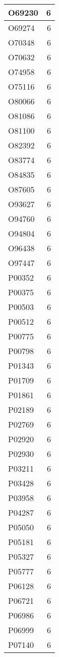 \documentclass[
]{book}
\theoremstyle{definition}
\theoremstyle{definition}
\theoremstyle{definition}
\theoremstyle{definition}
\theoremstyle{remark}
\begin{document}
\begin{table}
\begin{tabular}{l|r}
\hline
O69230 & 6\\
\hline
O69274 & 6\\
\hline
O70348 & 6\\
\hline
O70632 & 6\\
\hline
O74958 & 6\\
\hline
O75116 & 6\\
\hline
O80066 & 6\\
\hline
O81086 & 6\\
\hline
O81100 & 6\\
\hline
O82392 & 6\\
\hline
O83774 & 6\\
\hline
O84835 & 6\\
\hline
O87605 & 6\\
\hline
O93627 & 6\\
\hline
O94760 & 6\\
\hline
O94804 & 6\\
\hline
O96438 & 6\\
\hline
O97447 & 6\\
\hline
P00352 & 6\\
\hline
P00375 & 6\\
\hline
P00503 & 6\\
\hline
P00512 & 6\\
\hline
P00775 & 6\\
\hline
P00798 & 6\\
\hline
P01343 & 6\\
\hline
P01709 & 6\\
\hline
P01861 & 6\\
\hline
P02189 & 6\\
\hline
P02769 & 6\\
\hline
P02920 & 6\\
\hline
P02930 & 6\\
\hline
P03211 & 6\\
\hline
P03428 & 6\\
\hline
P03958 & 6\\
\hline
P04287 & 6\\
\hline
P05050 & 6\\
\hline
P05181 & 6\\
\hline
P05327 & 6\\
\hline
P05777 & 6\\
\hline
P06128 & 6\\
\hline
P06721 & 6\\
\hline
P06986 & 6\\
\hline
P06999 & 6\\
\hline
P07140 & 6\\

\end{tabular}
\end{table}
\end{document}
